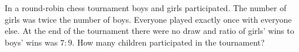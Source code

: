 In a round-robin chess tournament boys and girls participated. The number of girls was twice the number of boys. Everyone played exactly once with everyone else. At the end of the tournament there were no draw and ratio of girls' wins to boys' wins was $7:9$. How many children participated in the tournament?
